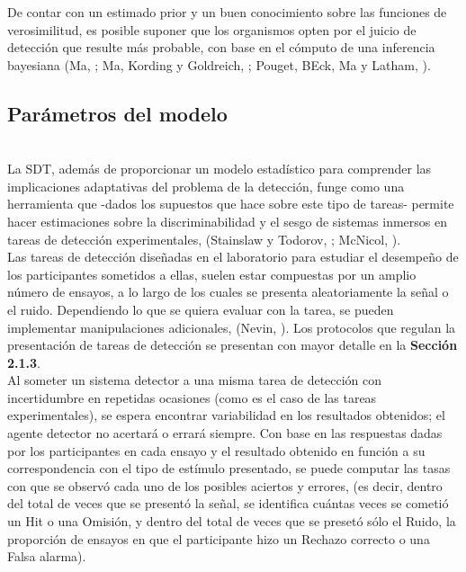 De contar con un estimado prior y un buen conocimiento sobre las funciones de verosimilitud, es posible suponer que los organismos opten por el juicio de detección que resulte más probable, con base en el cómputo de una inferencia bayesiana (Ma, \citeyear{WeijiMa}; Ma, Kording y Goldreich, \citeyear{WeijiMa2012}; Pouget, BEck, Ma y Latham, \citeyear{Pouget2013}).\\

\subsection{Parámetros del modelo}\\

La SDT, además de proporcionar un modelo estadístico para comprender las implicaciones adaptativas del problema de la detección, funge como una herramienta que -dados los supuestos que hace sobre este tipo de tareas- permite hacer estimaciones sobre la discriminabilidad y el sesgo de sistemas inmersos en tareas de detección experimentales, (Stainslaw y Todorov, \citeyear{Stainslaw1999}; McNicol, \citeyear{McNicol1}).\\

Las tareas de detección diseñadas en el laboratorio para estudiar el desempeño de los participantes sometidos a ellas, suelen estar compuestas por un amplio número de ensayos, a lo largo de los cuales se presenta aleatoriamente la señal o el ruido. Dependiendo lo que se quiera evaluar con la tarea, se pueden implementar manipulaciones adicionales, (Nevin, \citeyear{Nevin1969}). Los protocolos que regulan la presentación de tareas de detección se presentan con mayor detalle en la \textbf{Sección 2.1.3}.\\

Al someter un sistema detector a una misma tarea de detección con incertidumbre en repetidas ocasiones (como es el caso de las tareas experimentales), se espera encontrar variabilidad en los resultados obtenidos; el agente detector no acertará o errará siempre. Con base en las respuestas dadas por los participantes en cada ensayo y el resultado obtenido en función a su correspondencia con el tipo de estímulo presentado, se puede computar las tasas con que se observó cada uno de los posibles aciertos y errores, (es decir, dentro del total de veces que se presentó la señal, se identifica cuántas veces se cometió un Hit o una Omisión, y dentro del total de veces que se presetó sólo el Ruido, la proporción de ensayos en que el participante hizo un Rechazo correcto o una Falsa alarma).\\

